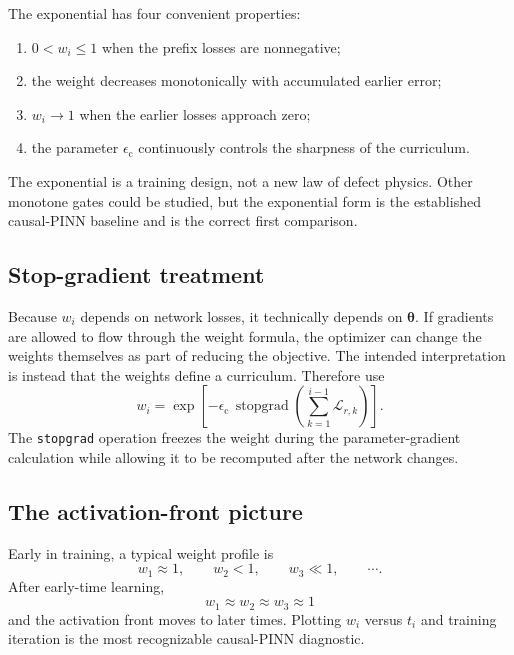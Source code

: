\documentclass[11pt]{article}
\newcommand{\thetav}{\bm{\theta}}
\newcommand{\stgrad}{\operatorname{stopgrad}}
\newcommand{\epsc}{\epsilon_{\mathrm{c}}}
\begin{document}
The exponential has four convenient properties:
\begin{enumerate}[label=\arabic*.]
    \item $0<w_i\le 1$ when the prefix losses are nonnegative;
    \item the weight decreases monotonically with accumulated earlier error;
    \item $w_i\rightarrow 1$ when the earlier losses approach zero;
    \item the parameter $\epsc$ continuously controls the sharpness of the curriculum.
\end{enumerate}

The exponential is a training design, not a new law of defect physics. Other monotone gates could be studied, but the exponential form is the established causal-PINN baseline and is the correct first comparison.

\subsection{Stop-gradient treatment}

Because $w_i$ depends on network losses, it technically depends on $\thetav$. If gradients are allowed to flow through the weight formula, the optimizer can change the weights themselves as part of reducing the objective. The intended interpretation is instead that the weights define a curriculum. Therefore use
\begin{equation}
w_i
=
\exp\left[
-\epsc\,
\stgrad\left(
\sum_{k=1}^{i-1}
\mathcal{L}_{r,k}
\right)
\right].
\label{eq:causal_weight_stop}
\end{equation}
The \texttt{stopgrad} operation freezes the weight during the parameter-gradient calculation while allowing it to be recomputed after the network changes.

\subsection{The activation-front picture}

Early in training, a typical weight profile is
\begin{equation}
w_1\approx 1,
\qquad
w_2<1,
\qquad
w_3\ll 1,
\qquad
\cdots.
\end{equation}
After early-time learning,
\begin{equation}
w_1\approx w_2\approx w_3\approx 1
\end{equation}
and the activation front moves to later times. Plotting $w_i$ versus $t_i$ and training iteration is the most recognizable causal-PINN diagnostic.
\end{document}
